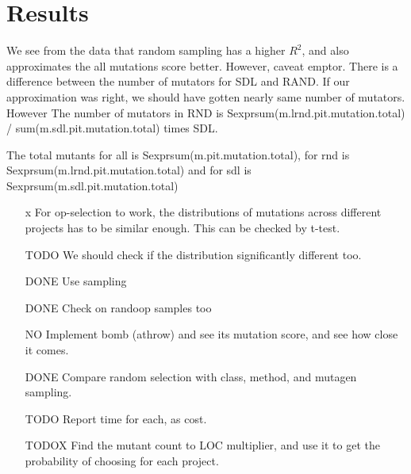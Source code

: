 \section{Results}
\label{sec:results}
We see from the data that random sampling has a higher $R^2$, and also approximates the all  mutations score better.
However, caveat emptor. There is a difference between the number of mutators for SDL and RAND. If our approximation was right, we should have gotten nearly same number of mutators. However
The number of mutators in RND is
 Sexpr{sum(m.lrnd.pit.mutation.total) / sum(m.sdl.pit.mutation.total)} times SDL.

The total mutants for all is Sexpr{sum(m.pit.mutation.total)}, for rnd is Sexpr{sum(m.lrnd.pit.mutation.total)} and for sdl is Sexpr{sum(m.sdl.pit.mutation.total)}

\begin{enumerate}
\item [x] For op-selection to work, the distributions of mutations across different projects has to be similar enough. This can be checked by t-test.
\item [TODO] We should check if the distribution significantly different too.
\item [DONE] Use sampling
\item [DONE] Check on randoop samples too
\item [NO] Implement bomb (athrow) and see its mutation score, and see how close it comes.
\item [DONE] Compare random selection with class, method, and mutagen sampling.
\item [TODO] Report time for each, as cost.
\item [TODOX] Find the mutant count to LOC multiplier, and use it to get the probability of choosing for each project.
\end{enumerate}